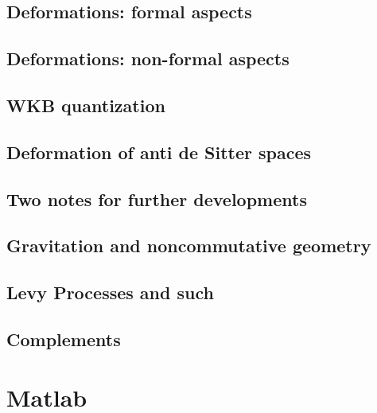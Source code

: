 \documentclass[a4paper,twoside,11pt]{book}
\begin{document}
\chapter{Deformations: formal aspects}          \label{ChapDefo}


\chapter{Deformations: non-formal aspects}




\chapter{WKB quantization}


\chapter{Deformation of anti de Sitter spaces}   \label{ChDefoBH}


\chapter{Two notes for further developments}        \label{ChapNoteDev}



\chapter{Gravitation and noncommutative geometry}


\chapter{Levy Processes and such}


\chapter{Complements}









\emptyInputPath
{}

\part{Matlab}

\end{document}
